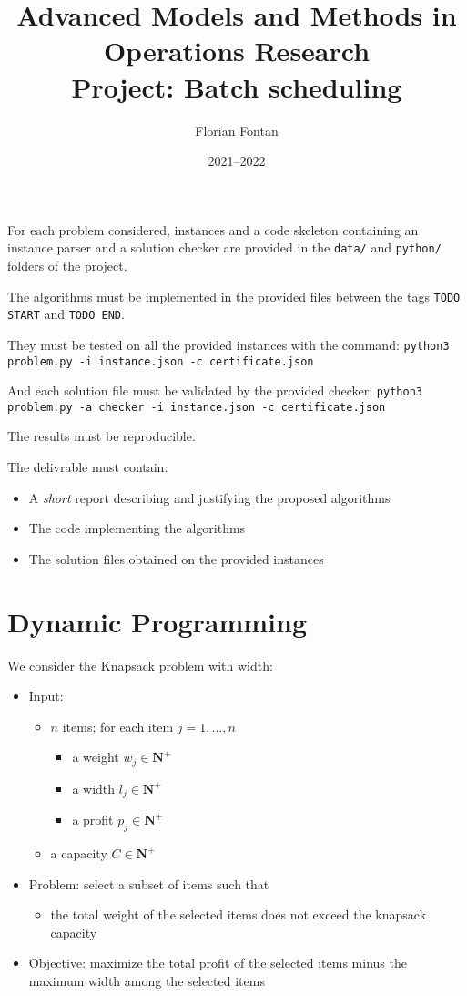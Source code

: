 \documentclass[a4paper,twocolumn]{article}
\author{Florian Fontan}
\title{Advanced Models and Methods in Operations Research \\ Project: Batch scheduling}
\date{2021--2022}
\newcommand{\N}{\mathbf{N}}
\begin{document}
\maketitle

For each problem considered, instances and a code skeleton containing an instance parser and a solution checker are provided in the \texttt{data/} and \texttt{python/} folders of the project.

The algorithms must be implemented in the provided files between the tags \texttt{TODO START} and \texttt{TODO END}.

They must be tested on all the provided instances with the command:
\texttt{python3 problem.py -i instance.json -c certificate.json}

And each solution file must be validated by the provided checker:
\texttt{python3 problem.py -a checker -i instance.json -c certificate.json}

The results must be reproducible.

\bigskip

The delivrable must contain:
\begin{itemize}
  \item A \emph{short} report describing and justifying the proposed algorithms
  \item The code implementing the algorithms
  \item The solution files obtained on the provided instances
\end{itemize}

\section{Dynamic Programming}

We consider the Knapsack problem with width:
\begin{itemize}
  \item Input:
    \begin{itemize}
      \item $n$ items; for each item $j = 1, \dots, n$
        \begin{itemize}
          \item a weight $w_j \in \N^+$
          \item a width $l_j \in \N^+$
          \item a profit $p_j \in \N^+$
        \end{itemize}
      \item a capacity $C \in \N^+$
    \end{itemize}
  \item Problem: select a subset of items such that
    \begin{itemize}
      \item the total weight of the selected items does not exceed the knapsack capacity
    \end{itemize}
  \item Objective: maximize the total profit of the selected items minus the maximum width among the selected items
\end{itemize}
\end{document}
